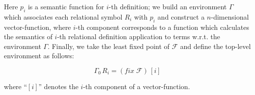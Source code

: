 Here $p_i$ is a semantic function for $i$-th definition; we build an environment $\Gamma$ which associates each relational symbol
$R_i$ with $p_i$ and construct a $n$-dimensional vector-function, where $i$-th component corresponds to a function which
calculates the semantics of $i$-th relational definition application to terms w.r.t. the environment $\Gamma$. Finally,
we take the least fixed point of $\mathcal{F}$ and define the top-level environment as follows:

\[
\Gamma_0\,R_i=(fix\;\mathcal{F})\,[i]
\]

where ``$[i]$'' denotes the $i$-th component of a vector-function.
